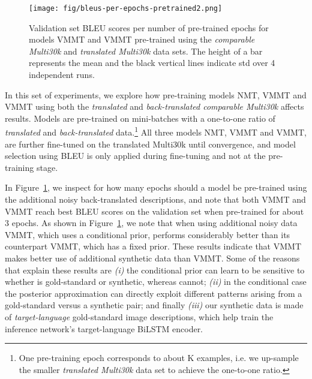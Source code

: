 \documentclass[11pt,a4paper]{article}
\newcommand{\cond}{VMMT\xspace}
\newcommand{\uncond}{VMMT\xspace}
\begin{document}
\begin{figure}[t!]
  \centering
  \texttt{[image: fig/bleus-per-epochs-pretrained2.png]}
  \caption{\label{fig:backtrans}Validation set BLEU scores per number of pre-trained epochs for models \cond and \uncond pre-trained using the \emph{comparable Multi30k} and \emph{translated Multi30k} data sets. The height of a bar represents the mean and the black vertical lines indicate  std over 4 independent runs.}
\end{figure}

In this set of experiments, we explore how pre-training models NMT, \uncond and \cond using both the \emph{translated} and \emph{back-translated comparable Multi30k} affects results.
Models are pre-trained on mini-batches with a one-to-one ratio of \emph{translated} and \emph{back-translated} data.\footnote{One pre-training epoch corresponds to about K examples, i.e. we up-sample the smaller \emph{translated Multi30k} data set to achieve the one-to-one ratio.}
All three models NMT, \uncond and \cond, are further fine-tuned on the translated Multi30k until convergence, and model selection using BLEU is only applied during fine-tuning and not at the pre-training stage.

In Figure~\ref{fig:backtrans}, we inspect for how many epochs should a model be pre-trained using the additional noisy back-translated descriptions, and
note that both \uncond and \cond reach best BLEU scores on the validation set when pre-trained for about 3 epochs.
As shown in Figure~\ref{fig:backtrans}, we note that when using additional noisy data \cond, which uses a conditional prior, performs considerably better than its counterpart \uncond, which has a fixed prior.
These results indicate that \cond makes better use of additional synthetic data than \uncond.
Some of the reasons that explain these results are
\textit{(i)} the conditional prior  can learn to be sensitive to whether  is gold-standard or synthetic, whereas  cannot;
\textit{(ii)} in the conditional case the posterior approximation  can directly exploit different patterns arising from a gold-standard versus a synthetic  pair; and finally
\textit{(iii)} our synthetic data is made of \emph{target-language} gold-standard image descriptions, which help train the inference network's target-language BiLSTM encoder.
\end{document}
